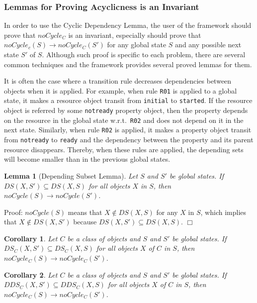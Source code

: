 \documentclass[12pt]{report}
\newtheorem{lemma}{Lemma}
\newtheorem{corollary}{Corollary}
\newcommand{\ra}{\rightarrow}
\begin{document}
\subsubsection{Lemmas for Proving Acyclicness is an Invariant}
In order to use the Cyclic Dependency Lemma, the user of the framework
should prove that $noCycle_C$ is an invariant, especially should
prove that $noCycle_c(S) \ra noCycle_C(S')$ for any global state $S$
and any possible next state $S'$ of $S$. Although such proof is
specific to each problem, there are several common techniques and the
framework provides several proved lemmas for them.

It is often the case where a transition rule decreases dependencies
between objects when it is applied. For example, when rule {\tt R01}
is applied to a global state, it makes a resource object transit from
{\tt initial} to {\tt started}. If the resource object is referred by
some {\tt notready} property object, then the property depends on the
resource in the global state w.r.t.\ {\tt R02} and does not depend on it in the
next state. Similarly, when rule {\tt R02} is applied, it makes a
property object transit from {\tt notready} to {\tt ready} and the
dependency between the property and its parent resource disappears.
Thereby, when these rules are applied, the depending sets will become
smaller than in the previous global states.

\begin{lemma}[Depending Subset Lemma]
Let $S$ and $S'$ be global states.  If $DS(X,S')\subseteq DS(X,S)$ for all
objects $X$ in $S$, then $noCycle(S) \ra noCycle(S')$.
\end{lemma}
Proof: $noCycle(S)$ means that $X\not\in DS(X,S)$ for any $X$ in $S$,
which implies that $X\not\in DS(X,S')$ because $DS(X,S')\subseteq
DS(X,S)$.  $\Box$

\begin{corollary}
Let $C$ be a class of objects and $S$ and $S'$ be global states.  If
$DS\!_C(X,S')\subseteq DS\!_C(X,S)$ for all objects $X$ of $C$ in $S$,
then $noCycle_C(S) \ra noCycle_C(S')$.
\end{corollary}

\begin{corollary}
Let $C$ be a class of objects and $S$ and $S'$ be global states.  If
$DDS\!_C(X,S')\subseteq DDS\!_C(X,S)$ for all objects $X$ of $C$ in $S$,
then $noCycle_C(S) \ra noCycle_C(S')$.
\end{corollary}
\end{document}
